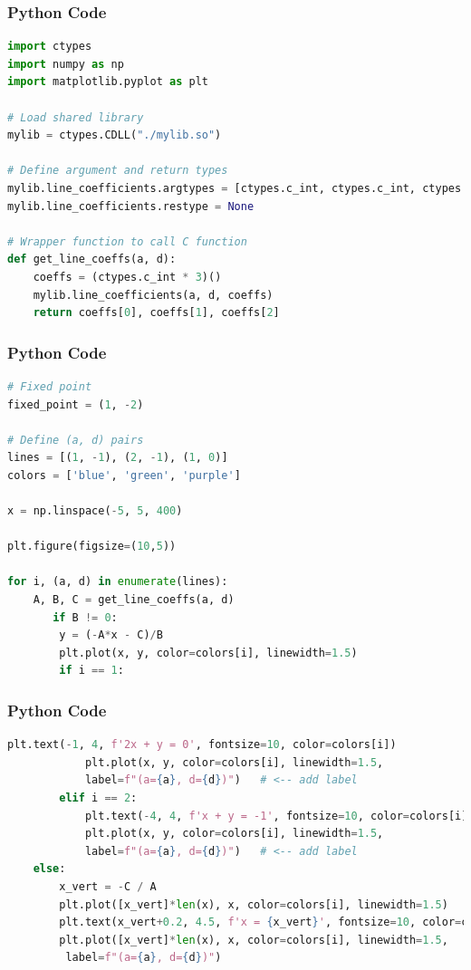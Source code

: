 \documentclass{beamer}
\begin{document}
\begin{frame}[fragile]
    \frametitle{Python Code}
    \begin{lstlisting}[language=Python]
import ctypes
import numpy as np
import matplotlib.pyplot as plt

# Load shared library
mylib = ctypes.CDLL("./mylib.so")

# Define argument and return types
mylib.line_coefficients.argtypes = [ctypes.c_int, ctypes.c_int, ctypes.POINTER(ctypes.c_int)]
mylib.line_coefficients.restype = None

# Wrapper function to call C function
def get_line_coeffs(a, d):
    coeffs = (ctypes.c_int * 3)()
    mylib.line_coefficients(a, d, coeffs)
    return coeffs[0], coeffs[1], coeffs[2]
    \end{lstlisting}
\end{frame}
\begin{frame}[fragile]
    \frametitle{Python Code}
    \begin{lstlisting}[language=Python]
# Fixed point
fixed_point = (1, -2)

# Define (a, d) pairs
lines = [(1, -1), (2, -1), (1, 0)]
colors = ['blue', 'green', 'purple']

x = np.linspace(-5, 5, 400)

plt.figure(figsize=(10,5))

for i, (a, d) in enumerate(lines):
    A, B, C = get_line_coeffs(a, d)
       if B != 0:
        y = (-A*x - C)/B
        plt.plot(x, y, color=colors[i], linewidth=1.5)
        if i == 1:
    \end{lstlisting}
\end{frame}


\begin{frame}[fragile]
    \frametitle{Python Code}
    \begin{lstlisting}[language=Python]
            plt.text(-1, 4, f'2x + y = 0', fontsize=10, color=colors[i])
            plt.plot(x, y, color=colors[i], linewidth=1.5, 
            label=f"(a={a}, d={d})")   # <-- add label
        elif i == 2:
            plt.text(-4, 4, f'x + y = -1', fontsize=10, color=colors[i])
            plt.plot(x, y, color=colors[i], linewidth=1.5, 
            label=f"(a={a}, d={d})")   # <-- add label
    else:
        x_vert = -C / A
        plt.plot([x_vert]*len(x), x, color=colors[i], linewidth=1.5)
        plt.text(x_vert+0.2, 4.5, f'x = {x_vert}', fontsize=10, color=colors[i])
        plt.plot([x_vert]*len(x), x, color=colors[i], linewidth=1.5, 
         label=f"(a={a}, d={d})")
    \end{lstlisting}
\end{frame}
\end{document}
